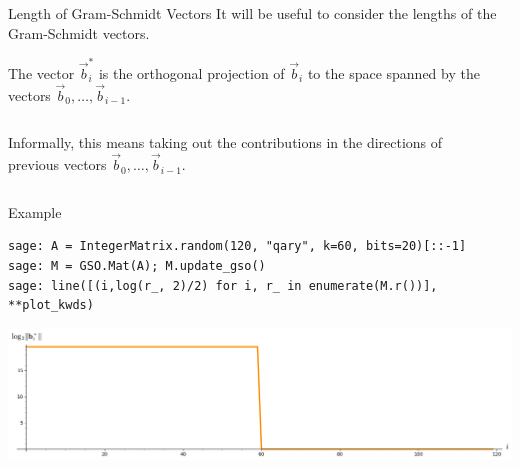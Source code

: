 \documentclass[xcolor=table,10pt,aspectratio=169]{beamer}
\begin{document}
\begin{frame}[label={sec:orgbd3d18b}]{Length of Gram-Schmidt Vectors}
It will be useful to consider the lengths of the Gram-Schmidt vectors.

The vector \(\vec{b}^*_i\) is the orthogonal projection of \(\vec{b}_i\) to the space spanned by the vectors \(\vec{b}_0, \ldots, \vec{b}_{i-1}\).

\begin{columns}
\begin{column}{0.45\columnwidth}
Informally, this means taking out the contributions in the directions of previous vectors  \(\vec{b}_0, \ldots, \vec{b}_{i-1}\).
\end{column}

\begin{column}{0.45\columnwidth}
\end{column}
\end{columns}
\end{frame}

\begin{frame}[label={sec:org14f5ae7},fragile]{Example}
 \lstset{language=sage,label= ,caption= ,captionpos=b,numbers=none}
\begin{lstlisting}
sage: A = IntegerMatrix.random(120, "qary", k=60, bits=20)[::-1]
sage: M = GSO.Mat(A); M.update_gso()
sage: line([(i,log(r_, 2)/2) for i, r_ in enumerate(M.r())], **plot_kwds)
\end{lstlisting}

\begin{center}
\includegraphics[width=.9\linewidth]{gram-schmidt-norms.png}
\end{center}
\end{frame}
\end{document}
